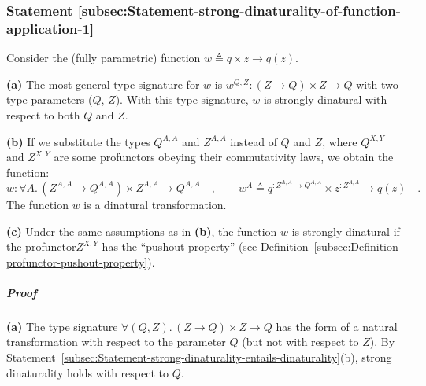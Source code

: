 \subsubsection{Statement \label{subsec:Statement-strong-dinaturality-of-function-application-1}\ref{subsec:Statement-strong-dinaturality-of-function-application-1}}

Consider the (fully parametric) function $w\triangleq q\times z\rightarrow q(z)$.

\textbf{(a)} The most general type signature for $w$ is $w^{Q,Z}:(Z\rightarrow Q)\times Z\rightarrow Q$
with two type parameters ($Q$, $Z$). With this type signature, $w$
is strongly dinatural with respect to both $Q$ and $Z$.

\textbf{(b)} If we substitute the types $Q^{A,A}$ and $Z^{A,A}$
instead of $Q$ and $Z$, where $Q^{X,Y}$ and $Z^{X,Y}$ are some
profunctors obeying their commutativity laws, we obtain the function:
\[
w:\forall A.\,(Z^{A,A}\rightarrow Q^{A,A})\times Z^{A,A}\rightarrow Q^{A,A}\quad,\quad\quad w^{A}\triangleq q^{:Z^{A,A}\rightarrow Q^{A,A}}\times z^{:Z^{A,A}}\rightarrow q(z)\quad.
\]
The function $w$ is a dinatural transformation.

\textbf{(c)} Under the same assumptions as in \textbf{(b)}, the function
$w$ is strongly dinatural if the profunctor$Z^{X,Y}$ has the \textsf{``}pushout
property\textsf{''} (see Definition~\ref{subsec:Definition-profunctor-pushout-property}).
\begin{comment}
Otherwise, $w$ is \emph{not} necessarily strongly dinatural. \textemdash{}
not clear if we can show a counterexample
\end{comment}


\subparagraph{Proof}

\textbf{(a)} The type signature $\forall(Q,Z).\,(Z\rightarrow Q)\times Z\rightarrow Q$
has the form of a natural transformation with respect to the parameter
$Q$ (but not with respect to $Z$). By Statement~\ref{subsec:Statement-strong-dinaturality-entails-dinaturality}(b),
strong dinaturality holds with respect to $Q$. 

